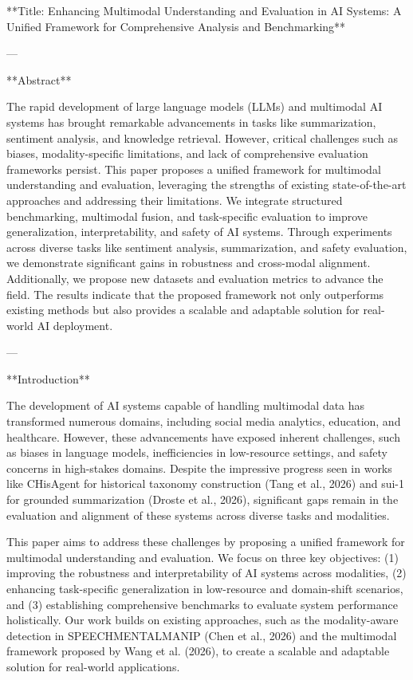 **Title: Enhancing Multimodal Understanding and Evaluation in AI Systems: A Unified Framework for Comprehensive Analysis and Benchmarking**

---

**Abstract**

The rapid development of large language models (LLMs) and multimodal AI systems has brought remarkable advancements in tasks like summarization, sentiment analysis, and knowledge retrieval. However, critical challenges such as biases, modality-specific limitations, and lack of comprehensive evaluation frameworks persist. This paper proposes a unified framework for multimodal understanding and evaluation, leveraging the strengths of existing state-of-the-art approaches and addressing their limitations. We integrate structured benchmarking, multimodal fusion, and task-specific evaluation to improve generalization, interpretability, and safety of AI systems. Through experiments across diverse tasks like sentiment analysis, summarization, and safety evaluation, we demonstrate significant gains in robustness and cross-modal alignment. Additionally, we propose new datasets and evaluation metrics to advance the field. The results indicate that the proposed framework not only outperforms existing methods but also provides a scalable and adaptable solution for real-world AI deployment.

---

**Introduction**

The development of AI systems capable of handling multimodal data has transformed numerous domains, including social media analytics, education, and healthcare. However, these advancements have exposed inherent challenges, such as biases in language models, inefficiencies in low-resource settings, and safety concerns in high-stakes domains. Despite the impressive progress seen in works like CHisAgent for historical taxonomy construction (Tang et al., 2026) and sui-1 for grounded summarization (Droste et al., 2026), significant gaps remain in the evaluation and alignment of these systems across diverse tasks and modalities.

This paper aims to address these challenges by proposing a unified framework for multimodal understanding and evaluation. We focus on three key objectives: (1) improving the robustness and interpretability of AI systems across modalities, (2) enhancing task-specific generalization in low-resource and domain-shift scenarios, and (3) establishing comprehensive benchmarks to evaluate system performance holistically. Our work builds on existing approaches, such as the modality-aware detection in SPEECHMENTALMANIP (Chen et al., 2026) and the multimodal framework proposed by Wang et al. (2026), to create a scalable and adaptable solution for real-world applications.

